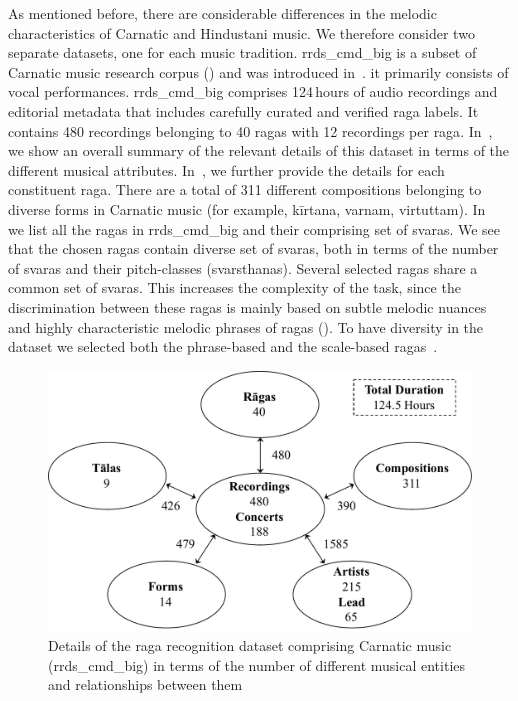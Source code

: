 {{{{ As mentioned before, there are considerable differences in the melodic characteristics of Carnatic and Hindustani music. We therefore consider two separate datasets, one for each music tradition. \acrshort{rrds_cmd_big} is a subset of Carnatic music research corpus () and was introduced in~\cite{gulatiphrase_2016}. it primarily consists of vocal performances. \acrshort{rrds_cmd_big} comprises 124\,hours of audio recordings and editorial metadata that includes carefully curated and verified \gls{raga} labels. It contains 480 recordings belonging to 40 \glspl{raga} with 12 recordings per \gls{raga}. In~, we show an overall summary of the relevant details of this dataset in terms of the different musical attributes. In~, we further provide the details for each constituent \gls{raga}. There are a total of 311 different compositions belonging to diverse forms in Carnatic music (for example, k\={i}rtana, varnam, virtuttam). In~ we list all the \glspl{raga} in \acrshort{rrds_cmd_big} and their comprising set of \glspl{svara}. We see that the chosen \glspl{raga} contain diverse set of \glspl{svara}, both in terms of the number of \glspl{svara} and their pitch-classes (\glspl{svarsthana}). Several selected \glspl{raga} share a common set of \glspl{svara}. This increases the complexity of the task, since the discrimination between these \glspl{raga} is mainly based on subtle melodic nuances and highly characteristic melodic phrases of \glspl{raga} (). To have diversity in the dataset we selected both the phrase-based and the scale-based \glspl{raga}~\citep{krishna2012carnatic,meer1980hindustani}.

 \begin{figure}
 	\begin{center}
 		\includegraphics[width=\figSizeNinety]{ch04_datasets/figures/carnatic_corpus_ragaDB.pdf}
 	\end{center}
 	\caption[Details of the \gls{raga} recognition dataset comprising Carnatic music]{Details of the \gls{raga} recognition dataset comprising Carnatic music (\acrshort{rrds_cmd_big}) in terms of the number of different musical entities and relationships between them}
 	\label{fig:carnatic_ragaDB_details}
 \end{figure}

}}}}
